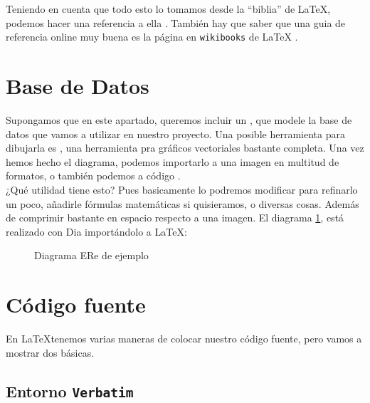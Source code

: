 Teniendo en cuenta que todo esto lo tomamos desde la ``biblia'' de
\LaTeX, podemos hacer una referencia a ella \cite{mitt04}. También hay
que saber que una guia de referencia online muy buena es la página en
\texttt{wikibooks} de \LaTeX{} \cite{website:latex-wikibooks}. 


\section{Base de Datos}

Supongamos que en este apartado, queremos incluir un , que modele la base de datos que vamos a
utilizar en nuestro proyecto. Una posible herramienta para dibujarla
es , una herramienta pra gráficos vectoriales bastante
completa. Una vez hemos hecho el diagrama, podemos importarlo a una
imagen en multitud de formatos, o también podemos a código
.\\

¿Qué utilidad tiene esto? Pues basicamente lo podremos modificar para
refinarlo un poco, añadirle fórmulas matemáticas si quisieramos, o
diversas cosas. Además de comprimir bastante en espacio respecto a una
imagen. El diagrama \ref{ERe}, está realizado con Dia importándolo a
\LaTeX{}:

\begin{figure}[H]
  \label{ERe}
  \begin{center}
    
  \end{center}
  \caption{Diagrama ERe de ejemplo}
\end{figure}


\section{Código fuente}

En \LaTeX tenemos varias maneras de colocar nuestro código fuente, pero
vamos a mostrar dos básicas.

\subsection{Entorno \texttt{Verbatim}}


